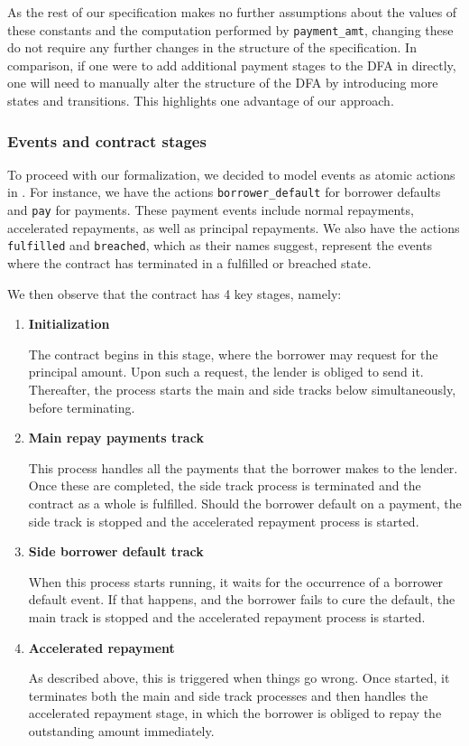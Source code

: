 \documentclass{article}
\begin{document}
As the rest of our specification makes no further assumptions about the values
of these constants and the computation performed by \texttt{payment\_amt},
changing these do not require any further changes in the structure of the 
specification.
In comparison, if one were to add additional payment stages to the DFA in
\cite{contract_as_automaton} directly, one will need to manually alter the
structure of the DFA by introducing more states and transitions.
This highlights one advantage of our approach.

\subsubsection{Events and contract stages}

To proceed with our formalization, we decided to model events as atomic
actions in \mcrl.
For instance, we have the actions \texttt{borrower\_default} for borrower
defaults and \texttt{pay} for payments.
These payment events include normal repayments, accelerated repayments,
as well as principal repayments.
We also have the actions \texttt{fulfilled} and \texttt{breached}, which as
their names suggest, represent the events where the contract has terminated
in a fulfilled or breached state.

We then observe that the contract has 4 key stages, namely:

\begin{enumerate}
  \item \textbf{Initialization}
  
  The contract begins in this stage, where the borrower may
  request for the principal amount.
  Upon such a request, the lender is obliged to send it.
  Thereafter, the process starts the main and side tracks below simultaneously,
  before terminating.

  \item \textbf{Main repay payments track}

  This process handles all the payments that the borrower makes to the lender.
  Once these are completed, the side track process is
  terminated and the contract as a whole is fulfilled.
  Should the borrower default on a payment, the side track is stopped and
  the accelerated repayment process is started.

  \item \textbf{Side borrower default track}

  When this process starts running, it waits for the occurrence of a borrower
  default event.
  If that happens, and the borrower fails to cure the default,
  the main track is stopped and the accelerated repayment process is started.

  \item \textbf{Accelerated repayment}

  As described above, this is triggered when things go wrong.
  Once started, it terminates both the main and side track processes and then
  handles the accelerated repayment stage, in which the borrower is obliged to
  repay the outstanding amount immediately.
\end{enumerate}
\end{document}
